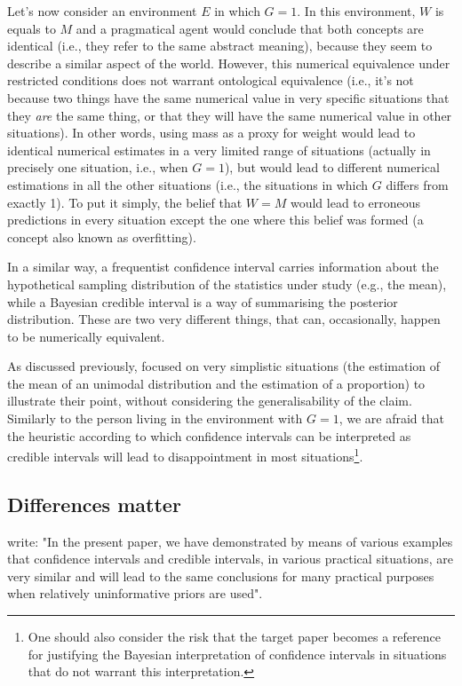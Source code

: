 \documentclass[a4paper,man,natbib,floatsintext,donotrepeattitle]{apa6}
\begin{document}
Let's now consider an environment $E$ in which $G = 1$. In this environment, $W$ is equals to $M$ and a pragmatical agent would conclude that both concepts are identical (i.e., they refer to the same abstract meaning), because they seem to describe a similar aspect of the world. However, this numerical equivalence under restricted conditions does not warrant ontological equivalence (i.e., it's not because two things have the same numerical value in very specific situations that they \textit{are} the same thing, or that they will have the same numerical value in other situations). In other words, using mass as a proxy for weight would lead to identical numerical estimates in a very limited range of situations (actually in precisely one situation, i.e., when $G = 1$), but would lead to different numerical estimations in all the other situations (i.e., the situations in which $G$ differs from exactly 1). To put it simply, the belief that $W = M$ would lead to erroneous predictions in every situation except the one where this belief was formed (a concept also known as overfitting).

In a similar way, a frequentist confidence interval carries information about the hypothetical sampling distribution of the statistics under study (e.g., the mean), while a Bayesian credible interval is a way of summarising the posterior distribution. These are two very different things, that can, occasionally, happen to be numerically equivalent.

As discussed previously, \cite{albers_credible_2018} focused on very simplistic situations (the estimation of the mean of an unimodal distribution and the estimation of a proportion) to illustrate their point, without considering the generalisability of the claim. Similarly to the person living in the environment with $G = 1$, we are afraid that the heuristic according to which confidence intervals can be interpreted as credible intervals will lead to disappointment in most situations\footnote{One should also consider the risk that the target paper becomes a reference for justifying the Bayesian interpretation of confidence intervals in situations that do not warrant this interpretation.}.

\subsection{Differences matter}

\cite{albers_credible_2018} write: "In the present paper, we have demonstrated by means of various examples that confidence intervals and credible intervals, in various practical situations, are very similar and will lead to the same conclusions for many practical purposes when relatively uninformative priors are used".
\end{document}
